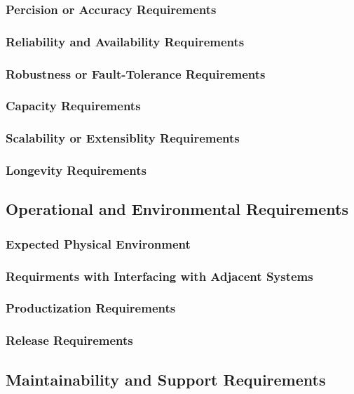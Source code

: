 \documentclass{article}
\begin{document}
\subsubsection{Percision or Accuracy Requirements}
\subsubsection{Reliability and Availability Requirements}
\subsubsection{Robustness or Fault-Tolerance Requirements}
\subsubsection{Capacity Requirements}
\subsubsection{Scalability or Extensiblity Requirements}
\subsubsection{Longevity Requirements}

\subsection{Operational and Environmental Requirements}
\subsubsection{Expected Physical Environment}
\subsubsection{Requirments with Interfacing with Adjacent Systems}
\subsubsection{Productization Requirements}
\subsubsection{Release Requirements}

\subsection{Maintainability and Support Requirements}
\end{document}

